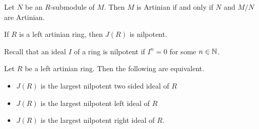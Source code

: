 \documentclass[a4paper]{article}
\begin{document}
\begin{prp}{}{} Let $N$ be an $R$-submodule of $M$. Then $M$ is Artinian if and only if $N$ and $M/N$ are Artinian. 
\end{prp}

\begin{thm}{}{} If $R$ is a left artinian ring, then $J(R)$ is nilpotent. 
\end{thm}

Recall that an ideal $I$ of a ring is nilpotent if $I^n=0$ for some $n\in\mathbb{N}$. 

\begin{crl}{}{} Let $R$ be a left artinian ring. Then the following are equivalent. 
\begin{itemize}
\item $J(R)$ is the largest nilpotent two sided ideal of $R$
\item $J(R)$ is the largest nilpotent left ideal of $R$
\item $J(R)$ is the largest nilpotent right ideal of $R$. 
\end{itemize}
\end{crl}
\end{document}
